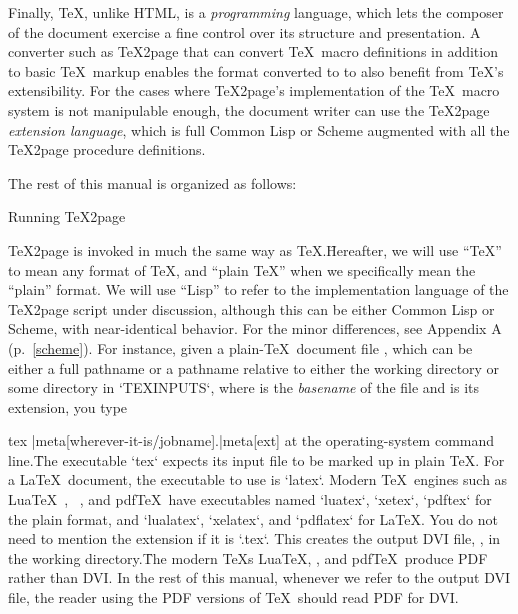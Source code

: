 Finally, \TeX, unlike HTML, is a {\em programming}
language, which lets the composer of the document
exercise a fine control over its structure and
presentation.  A converter such as \TeX2page that can
convert \TeX\ macro definitions in addition to basic \TeX\
markup enables the format converted to to also benefit
from \TeX’s extensibility.  For the cases where
\TeX2page’s implementation of the \TeX\ macro system is
not manipulable enough, the document writer can use the
\TeX2page {\em extension language}, which is full Common Lisp or
Scheme
augmented with all the \TeX2page procedure definitions.

The rest of this manual is organized as follows:

\medskip

\tableofcontents

 Running \TeX2page

%
\TeX2page is invoked in much the same way as \TeX.\f{Hereafter,
we will use “\TeX” to mean
any format of \TeX, and “plain \TeX” when we
specifically mean the “plain” format. We will use “Lisp” to refer
to the implementation language of the \TeX2page script under
discussion, although this can be either Common Lisp or Scheme,
with near-identical behavior. For the minor differences, see
Appendix A (p.~\ref{scheme}).}
For instance, given a plain-\TeX\ document file
, which can
be either a full pathname or a pathname relative to either the
working directory or some directory in `TEXINPUTS`, where
 is the {\em basename} of the file
and  is its extension, you type

\begintt
tex |meta[wherever-it-is/jobname].|meta[ext]
\endtt
%
at the operating-system command line.\f{The executable `tex` expects
its input file to be marked up in plain \TeX.  For a \LaTeX\ document, the
executable to use is `latex`. Modern \TeX\ engines such as
Lua\TeX~\cite{luatex}, \XeTeX~\cite{xetex}, and pdf\TeX\ have
executables named `luatex`, `xetex`, `pdftex` for the plain
format, and `lualatex`, `xelatex`, and `pdflatex` for \LaTeX.}  You do not need to mention the extension
\p{.|meta[ext]} if it is `.tex`.  This creates the output DVI file,
\p{|meta[jobname].dvi}, in the working directory.\f{The modern \TeX s
Lua\TeX, \XeTeX, and
pdf\TeX\ produce PDF rather than DVI.  In the rest of this manual,
whenever we refer to the output DVI file, the reader using the PDF versions
of \TeX\ should read PDF for DVI.}

